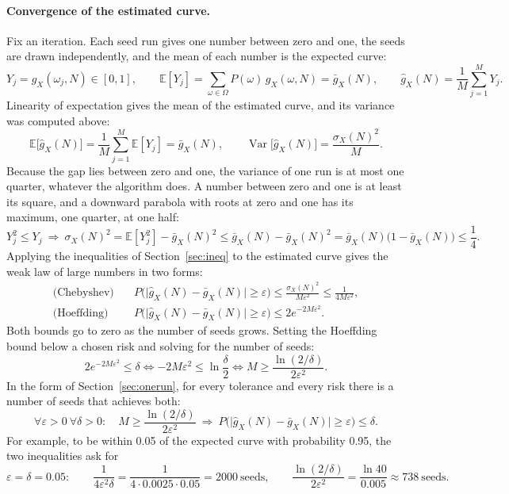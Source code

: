 \documentclass[11pt]{article}
\begin{document}
\paragraph{Convergence of the estimated curve.} Fix an iteration. Each seed run gives one number
between zero and one, the seeds are drawn independently, and the mean of each number is the expected
curve:
\[
  Y_j = g_X(\omega_j, N) \in [0, 1], \qquad
  \mathbb{E}[Y_j] = \sum_{\omega \in \Omega} P(\omega)\, g_X(\omega, N) = \bar g_X(N), \qquad
  \hat g_X(N) = \frac{1}{M} \sum_{j=1}^{M} Y_j .
\]
Linearity of expectation gives the mean of the estimated curve, and its variance was computed above:
\[
  \mathbb{E}\big[\hat g_X(N)\big] = \frac{1}{M} \sum_{j=1}^{M} \mathbb{E}[Y_j] = \bar g_X(N), \qquad
  \operatorname{Var}\big[\hat g_X(N)\big] = \frac{\sigma_X(N)^2}{M} .
\]
Because the gap lies between zero and one, the variance of one run is at most one quarter, whatever
the algorithm does. A number between zero and one is at least its square, and a downward parabola
with roots at zero and one has its maximum, one quarter, at one half:
\[
  Y_j^2 \le Y_j \ \Longrightarrow\ \sigma_X(N)^2 = \mathbb{E}[Y_j^2] - \bar g_X(N)^2
  \le \bar g_X(N) - \bar g_X(N)^2 = \bar g_X(N)\big(1 - \bar g_X(N)\big) \le \frac{1}{4} .
\]
Applying the inequalities of Section~\ref{sec:ineq} to the estimated curve gives the weak law of large
numbers in two forms:
\begin{align*}
  \text{(Chebyshev)} \quad & P\Big(\big|\hat g_X(N) - \bar g_X(N)\big| \ge \varepsilon\Big)
    \le \frac{\sigma_X(N)^2}{M \varepsilon^2} \le \frac{1}{4 M \varepsilon^2}, \\
  \text{(Hoeffding)} \quad & P\Big(\big|\hat g_X(N) - \bar g_X(N)\big| \ge \varepsilon\Big)
    \le 2 e^{-2 M \varepsilon^2} .
\end{align*}
Both bounds go to zero as the number of seeds grows. Setting the Hoeffding bound below a chosen risk
and solving for the number of seeds:
\[
  2 e^{-2 M \varepsilon^2} \le \delta \iff -2 M \varepsilon^2 \le \ln \frac{\delta}{2}
  \iff M \ge \frac{\ln(2/\delta)}{2 \varepsilon^2} .
\]
In the form of Section~\ref{sec:onerun}, for every tolerance and every risk there is a number of
seeds that achieves both:
\[
  \forall \varepsilon > 0 \ \forall \delta > 0 : \quad
  M \ge \frac{\ln(2/\delta)}{2 \varepsilon^2}
  \ \Longrightarrow\ P\Big(\big|\hat g_X(N) - \bar g_X(N)\big| \ge \varepsilon\Big) \le \delta .
\]
For example, to be within 0.05 of the expected curve with probability 0.95, the two inequalities ask
for
\[
  \varepsilon = \delta = 0.05: \qquad
  \frac{1}{4 \varepsilon^2 \delta} = \frac{1}{4 \cdot 0.0025 \cdot 0.05} = 2000 \ \text{seeds}, \qquad
  \frac{\ln(2/\delta)}{2 \varepsilon^2} = \frac{\ln 40}{0.005} \approx 738 \ \text{seeds} .
\]
\end{document}

